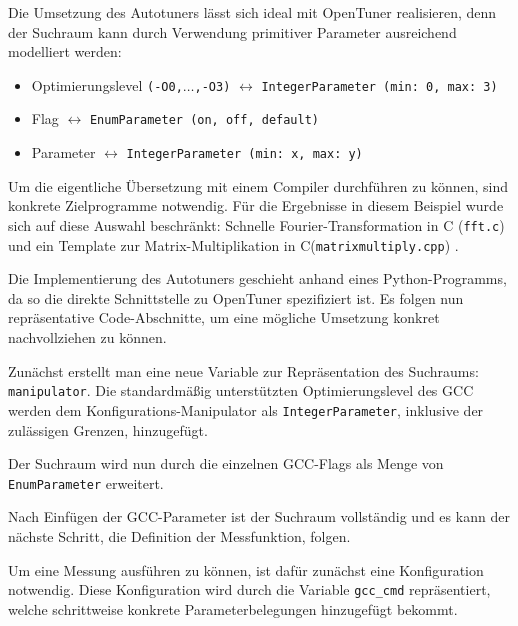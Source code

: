 \documentclass[a4paper,11pt]{scrartcl}
\def\CC{{C\nolinebreak[4]\hspace{-.05em}\raisebox{.4ex}{\tiny\bf ++}}}
\begin{document}
Die Umsetzung des Autotuners lässt sich ideal mit OpenTuner realisieren, denn der
Suchraum kann durch Verwendung primitiver Parameter ausreichend modelliert werden:
\begin{itemize}
  \item Optimierungslevel \texttt{(-O0,$\ldots$,-O3)} $\leftrightarrow$ \texttt{IntegerParameter~(min:~0, max:~3)}
  \item Flag $\leftrightarrow$ \texttt{EnumParameter~(on,~off,~default)}
  \item Parameter $\leftrightarrow$ \texttt{IntegerParameter~(min:~x, max:~y)}
\end{itemize}
Um die eigentliche Übersetzung mit einem Compiler durchführen zu können, sind konkrete
Zielprogramme notwendig. Für die Ergebnisse in diesem Beispiel wurde sich auf diese
Auswahl beschränkt: Schnelle Fourier-Transformation in C (\texttt{fft.c}) \cite{fftc} und 
ein Template zur Matrix-Multiplikation in \CC (\texttt{matrixmultiply.cpp}) \cite{mmcpp}. \newline

Die Implementierung des Autotuners geschieht anhand eines Python-Programms, da so die direkte Schnittstelle
zu OpenTuner spezifiziert ist. Es folgen nun repräsentative Code-Abschnitte, um eine
mögliche Umsetzung konkret nachvollziehen zu können.  \newline


Zunächst erstellt man eine neue Variable zur Repräsentation des Suchraums: \texttt{manipulator}.
Die standardmäßig unterstützten Optimierungslevel des GCC werden dem Konfigurations-Manipulator
als \texttt{IntegerParameter}, inklusive der zulässigen Grenzen, hinzugefügt. \newline


Der Suchraum wird nun durch die einzelnen GCC-Flags als Menge von \texttt{EnumParameter} 
erweitert. \newline


Nach Einfügen der GCC-Parameter ist der Suchraum vollständig und es kann der nächste Schritt,
die Definition der Messfunktion, folgen. \newline


Um eine Messung ausführen zu können, ist dafür zunächst eine Konfiguration notwendig.
Diese Konfiguration wird durch die Variable \texttt{gcc\_cmd} repräsentiert, welche
schrittweise konkrete Parameterbelegungen hinzugefügt bekommt. \newline
\end{document}
